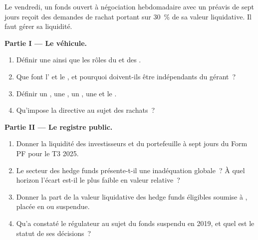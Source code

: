 \begin{problem}\label{pb:fm:the-asset-manager-and-the-fund:1}
Le vendredi, un fonds ouvert à négociation hebdomadaire avec un préavis de sept jours reçoit des demandes de rachat portant sur 30~\% de sa valeur liquidative. Il faut gérer sa liquidité.

\medskip\noindent\textbf{Partie I --- Le véhicule.}
\begin{enumerate}
\item Définir une  ainsi que les rôles du  et des .
\item Que font l' et le , et pourquoi doivent-ils être indépendants du gérant~?
\item Définir un , une , un , une  et le .
\item Qu'impose la directive  au sujet des rachats~?
\end{enumerate}

\medskip\noindent\textbf{Partie II --- Le registre public.}
\begin{enumerate}[resume]
\item Donner la liquidité des investisseurs et du portefeuille à sept jours du Form PF pour le T3 2025.
\item Le secteur des hedge funds présente-t-il une inadéquation globale~? À quel horizon l'écart est-il le plus faible en valeur relative~?
\item Donner la part de la valeur liquidative des hedge funds éligibles soumise à , placée en  ou suspendue.
\item Qu'a constaté le régulateur au sujet du fonds suspendu en 2019, et quel est le statut de ses décisions~?
\end{enumerate}


\end{problem}
